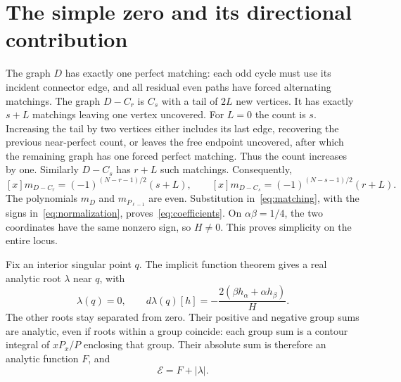 \documentclass[11pt,a4paper]{article}
\theoremstyle{remark}
\newcommand{\E}{\mathcal E}
\begin{document}
\section{The simple zero and its directional contribution}\label{sec:singular}

The graph $D$ has exactly one perfect matching: each odd cycle must
use its incident connector edge, and all residual even paths have
forced alternating matchings. The graph $D-C_r$ is $C_s$ with a tail
of $2L$ new vertices. It has exactly $s+L$ matchings leaving one
vertex uncovered. For $L=0$ the count is $s$. Increasing the tail by
two vertices either includes its last edge, recovering the previous
near-perfect count, or leaves the free endpoint uncovered, after
which the remaining graph has one forced perfect matching. Thus the
count increases by one. Similarly $D-C_s$ has $r+L$ such matchings.
Consequently,
\[
 [x]m_{D-C_r}=(-1)^{(N-r-1)/2}(s+L),\qquad
 [x]m_{D-C_s}=(-1)^{(N-s-1)/2}(r+L).
\]
The polynomials $m_D$ and $m_{P_{\ell-1}}$ are even.
Substitution in~\eqref{eq:matching}, with the signs
in~\eqref{eq:normalization}, proves~\eqref{eq:coefficients}.
On $\alpha\beta=1/4$, the two coordinates have the same nonzero
sign, so $H\ne0$. This proves simplicity on the entire locus.

Fix an interior singular point $q$. The implicit function theorem
gives a real analytic root $\lambda$ near $q$, with
\begin{equation}\label{eq:zero-slope}
 \lambda(q)=0,\qquad
 d\lambda(q)[h]=-\frac{2(\beta h_\alpha+\alpha h_\beta)}{H}.
\end{equation}
The other roots stay separated from zero. Their positive and negative
group sums are analytic, even if roots within a group coincide:
each group sum is a contour integral of $xP_x/P$ enclosing that group.
Their absolute sum is therefore an analytic function $F$, and
\[
 \E=F+|\lambda|.
\]
\end{document}
